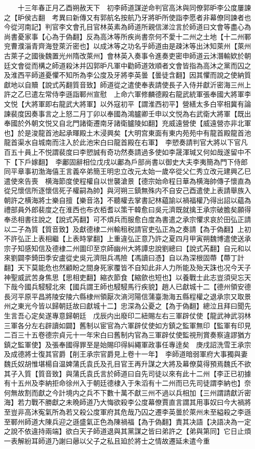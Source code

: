 　　十三年春正月乙酉朔赦天下　初李師道謀逆命判官高沐與同僚郭昈李公度屢諫之【昈侯古翻　考異曰新傳又有郭航名按航乃牙將昈所使詣李愿者非幕僚同諫者也今從河南記】判官李文會孔目官林英素為師道所親信涕泣言於師道曰文會等盡心為尚書憂家事【心為于偽翻】反為高沐等所疾尚書奈何不愛十二州之土地【十二州鄆兖曹濮淄青齊海登萊沂密也】以成沐等之功名乎師道由是疎沐等出沐知萊州【萊州古萊子之國後魏置光州隋改萊州】會林英入奏事令進奏吏密申師道云沐潛輸欵於朝廷文會從而構之師道殺沐并囚郭昈凡軍中勸師道效順者文會皆指為高沐之黨而囚之及淮西平師道憂懼不知所為李公度及牙將李英曇【曇徒含翻】因其懼而說之使納質獻地以自贖【說式芮翻質音致】師道從之遣使奉表請使長子入侍并獻沂密海三州上許之乙巳遣左常侍李遜詣鄆州宣慰　上命六軍修麟德殿右龍武統軍張奉國大將軍李文悦【大將軍即右龍武大將軍】以外寇初平【謂淮西初平】營繕太多白宰相冀有論諫裴度因奏事言之上怒二月丁卯以奉國為鴻臚卿壬申以文悦為右武衛大將軍【既出奉國於外朝文悦又自北門諸衛遷南牙諸衛臚陵如翻】充威遠營使【威遠營亦非北軍也】於是浚龍首池起承暉殿土木浸興矣【大明宫東面有東内苑苑中有龍首殿龍首池龍首渠水自城南而注入於此池宋白曰龍首殿在右軍】　李愬奏請判官大將以下官凡百五十員上不悦謂裴度曰李愬誠有奇功然奏請過多使如李晟渾瑊又何如哉遂留中不下【下戶嫁翻】　李鄘固辭相位戊戌以鄘為戶部尚書以御史大夫李夷簡為門下侍郎同平章事初渤海僖王言義卒弟簡王明忠立改元太始一歲卒從父仁秀立改元建興乙巳遣使來告喪　横海節度使程權自以世襲滄景【德宗始命程日華為横海帥傳子懷直為從兄懷信所逐懷信死子權嗣為帥】與河朔三鎮無殊内不自安己酉遣使上表請舉族入朝許之横海將士樂自擅【樂音洛】不聽權去掌書記林藴諭以禍福權乃得出詔以藴為禮部員外郎裴度之在淮西也布衣栢耆以策干韓愈曰吳元濟既就擒王承宗破膽矣願得奉丞相書往說之【說式芮翻】可不煩兵而服愈白度為書遣之承宗懼求哀於田弘正請以二子為質【質音致】及獻德棣二州輸租税請官吏弘正為之奏請【為于偽翻】上初不許弘正上表相繼【上表時掌翻】上重違弘正意乃許之夏四月甲寅朔魏博遣使送承宗子知感知信及德棣二州圖印至京師幽州大將譚忠說劉總曰【說式芮翻】自元和以來劉闢李錡田季安盧從史吳元濟阻兵馮險【馮讀曰憑】自以為深根固蔕【蔕丁計翻】天下莫能危也然顧盼之間身死家覆皆不自知此非人力所能及殆天誅也况今天子神聖威武苦身焦思【思相吏翻】縮衣節食【縮歛也短也】以養戰士此志豈須臾忘天下哉今國兵駸駸北來【國兵謂王師也駸駸馬行疾貌】趙人已獻城十二【德州領安德長河平原平昌將陵安陵六縣棣州領厭次滳河陽信蒲臺渤海五縣程權之退承宗又取景州之東光今皆以歸朝廷故曰獻城十二】忠深為公憂之【為于偽翻】總泣且拜曰聞先生言吾心定矣遂專意歸朝廷　戊辰内出廢印二紐賜左右三軍辟仗使【龍武神武羽林三軍各分左右辟讀如闢】舊制以宦官為六軍辟仗使如方鎮之監軍無印【監軍有印見二百三十五卷德宗貞元十一年宋白曰舊制内官為三軍辟仗使監視刑賞奏察違謬猶方鎮之監軍使】及張奉國得罪至是始賜印得糾繩軍政事任專逹矣　庚戌詔洗雪王承宗及成德將士復其官爵【削王承宗官爵見上卷十一年】　李師道暗弱軍府大事獨與妻魏氏奴胡惟堪楊自温婢蒲氏袁氏及孔目官王再升謀之大將及幕僚莫得預焉魏氏不欲其子入質【質音致】與蒲氏袁氏言於師道曰自先司徒以來有此十二州【李正已初據有十五州及李納拒命徐州入于朝廷德棣入于朱滔有十二州而已先司徒謂李納也】奈何無故割而獻之今計境内之兵不下數十萬不獻三州不過以兵相加【三州謂請獻沂密海】若力戰不勝獻之未晩師道乃大悔欲殺李公度幕僚賈直言謂其用事奴曰今大禍將至豈非高沐寃氣所為若又殺公度軍府其危哉乃囚之遷李英曇於萊州未至縊殺之李遜至鄆州師道大陳兵迎之遜盛氣正色為陳禍福【為于偽翻】責其决語【决語决為一定之說不依違持兩端】欲白天子師道退與其黨謀之皆曰弟許之【弟與第同】它日止煩一表解紛耳師道乃謝曰曏以父子之私且廹於將士之情故遷延未遣今重